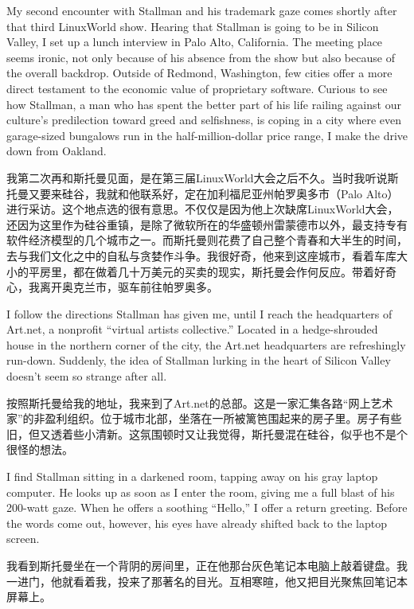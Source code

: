 \ifdefined\eng
My second encounter with Stallman and his trademark gaze comes shortly after that third LinuxWorld show. Hearing that Stallman is going to be in Silicon Valley, I set up a lunch interview in Palo Alto, California. The meeting place seems ironic, not only because of his absence from the show but also because of the overall backdrop. Outside of Redmond, Washington, few cities offer a more direct testament to the economic value of proprietary software. Curious to see how Stallman, a man who has spent the better part of his life railing against our culture's predilection toward greed and selfishness, is coping in a city where even garage-sized bungalows run in the half-million-dollar price range, I make the drive down from Oakland.
\fi

\ifdefined\chs
我第二次再和斯托曼见面，是在第三届LinuxWorld大会之后不久。当时我听说斯托曼又要来硅谷，我就和他联系好，定在加利福尼亚州帕罗奥多市（Palo Alto）进行采访。这个地点选的很有意思。不仅仅是因为他上次缺席LinuxWorld大会，还因为这里作为硅谷重镇，是除了微软所在的华盛顿州雷蒙德市以外，最支持专有软件经济模型的几个城市之一。而斯托曼则花费了自己整个青春和大半生的时间，去与我们文化之中的自私与贪婪作斗争。我很好奇，他来到这座城市，看着车库大小的平房里，都在做着几十万美元的买卖的现实，斯托曼会作何反应。带着好奇心，我离开奥克兰市，驱车前往帕罗奥多。
\fi

\ifdefined\eng
I follow the directions Stallman has given me, until I reach the headquarters of Art.net, a nonprofit ``virtual artists collective.'' Located in a hedge-shrouded house in the northern corner of the city, the Art.net headquarters are refreshingly run-down. Suddenly, the idea of Stallman lurking in the heart of Silicon Valley doesn't seem so strange after all.
\fi

\ifdefined\chs
按照斯托曼给我的地址，我来到了Art.net的总部。这是一家汇集各路``网上艺术家''的非盈利组织。位于城市北部，坐落在一所被篱笆围起来的房子里。房子有些旧，但又透着些小清新。这氛围顿时又让我觉得，斯托曼混在硅谷，似乎也不是个很怪的想法。
\fi

\ifdefined\eng
I find Stallman sitting in a darkened room, tapping away on his gray laptop computer. He looks up as soon as I enter the room, giving me a full blast of his 200-watt gaze. When he offers a soothing ``Hello,'' I offer a return greeting. Before the words come out, however, his eyes have already shifted back to the laptop screen.
\fi

\ifdefined\chs
我看到斯托曼坐在一个背阴的房间里，正在他那台灰色笔记本电脑上敲着键盘。我一进门，他就看着我，投来了那著名的目光。互相寒暄，他又把目光聚焦回笔记本屏幕上。
\fi

